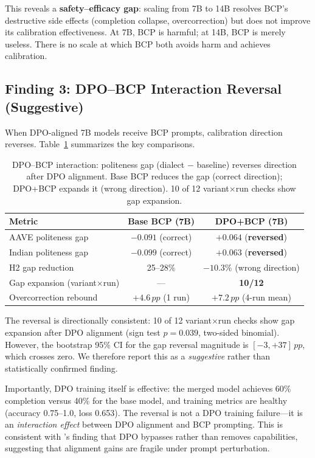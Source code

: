 \documentclass[11pt,a4paper]{article}
\newcommand{\pp}{\,pp}
\begin{document}
This reveals a \textbf{safety--efficacy gap}: scaling from 7B to 14B resolves BCP's destructive side effects (completion collapse, overcorrection) but does not improve its calibration effectiveness.
At 7B, BCP is harmful; at 14B, BCP is merely useless.
There is no scale at which BCP both avoids harm and achieves calibration.

\subsection{Finding 3: DPO--BCP Interaction Reversal (Suggestive)}
\label{sec:fm4}

When DPO-aligned 7B models receive BCP prompts, calibration direction reverses.
Table~\ref{tab:reversal} summarizes the key comparisons.

\begin{table}[t]
\centering
\caption{DPO--BCP interaction: politeness gap (dialect $-$ baseline) reverses direction after DPO alignment. Base BCP reduces the gap (correct direction); DPO+BCP expands it (wrong direction). 10 of 12 variant$\times$run checks show gap expansion.}
\label{tab:reversal}
\small
\begin{tabular}{@{}lcc@{}}
\toprule
Metric & Base BCP (7B) & DPO+BCP (7B) \\
\midrule
AAVE politeness gap       & $-0.091$ (correct) & $+0.064$ (\textbf{reversed}) \\
Indian politeness gap     & $-0.099$ (correct) & $+0.063$ (\textbf{reversed}) \\
H2 gap reduction          & 25--28\%           & $-10.3\%$ (wrong direction) \\
Gap expansion (variant$\times$run) & ---       & \textbf{10/12} \\
Overcorrection rebound    & $+4.6\pp$ (1 run)  & $+7.2\pp$ (4-run mean) \\
\bottomrule
\end{tabular}
\end{table}

The reversal is directionally consistent: 10 of 12 variant$\times$run checks show gap expansion after DPO alignment (sign test $p = 0.039$, two-sided binomial).
However, the bootstrap 95\% CI for the gap reversal magnitude is $[-3, +37]\pp$, which crosses zero.
We therefore report this as a \emph{suggestive} rather than statistically confirmed finding.

Importantly, DPO training itself is effective: the merged model achieves 60\% completion versus 40\% for the base model, and training metrics are healthy (accuracy 0.75--1.0, loss 0.653).
The reversal is not a DPO training failure---it is an \emph{interaction effect} between DPO alignment and BCP prompting.
This is consistent with \citet{lee2024dpo_toxicity}'s finding that DPO bypasses rather than removes capabilities, suggesting that alignment gains are fragile under prompt perturbation.
\end{document}
